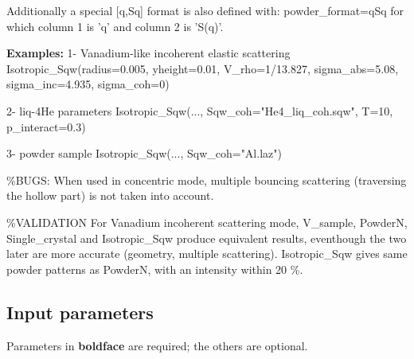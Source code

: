 Additionally a special [q,Sq] format is also defined with: powder\_format=qSq for which column 1 is 'q' and column 2 is 'S(q)'.

\textbf{Examples:} 1- Vanadium-like incoherent elastic scattering Isotropic\_Sqw(radius=0.005, yheight=0.01, V\_rho=1/13.827, sigma\_abs=5.08, sigma\_inc=4.935, sigma\_coh=0)

2- liq-4He parameters Isotropic\_Sqw(..., Sqw\_coh="He4\_liq\_coh.sqw", T=10, p\_interact=0.3)

3- powder sample Isotropic\_Sqw(..., Sqw\_coh="Al.laz")

\%BUGS: When used in concentric mode, multiple bouncing scattering (traversing the hollow part) is not taken into account.

\%VALIDATION For Vanadium incoherent scattering mode, V\_sample, PowderN, Single\_crystal and Isotropic\_Sqw produce equivalent results, eventhough the two later are more accurate (geometry, multiple scattering). Isotropic\_Sqw gives same powder patterns as PowderN, with an intensity within 20 \%.

\subsection*{Input parameters}
Parameters in \textbf{boldface} are required; the others are optional.

